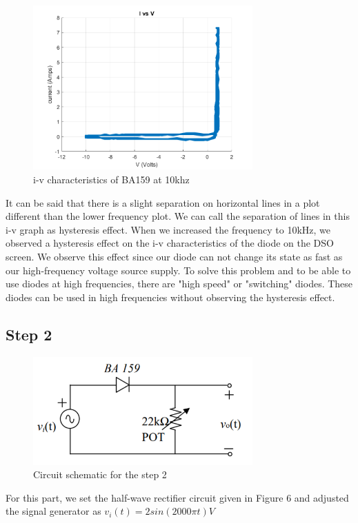 \documentclass[letterpaper,12pt]{article}
\begin{document}
\begin{figure}[H]
    \centering
    \includegraphics[width = 0.75\textwidth]{1_ba159_10khz.png}
    \caption{i-v characteristics of BA159 at 10khz}
\end{figure} 
It can be said that there is a slight separation on horizontal lines in a plot different than the lower frequency plot. We can call the separation of lines in this i-v graph as hysteresis effect. When we increased the frequency to 10kHz, we observed a hysteresis effect on the i-v characteristics of the diode on the DSO screen. We observe this effect since our diode can not change its state as fast as our high-frequency voltage source supply. To solve this problem and to be able to use diodes at high frequencies, there are "high speed" or "switching" diodes. These diodes can be used in high frequencies without observing the hysteresis effect.

\subsection{Step 2}

\begin{figure}[H]
    \centering
    \includegraphics[width = 0.75\textwidth]{2_1.png}
    \caption{Circuit schematic for the step 2}
\end{figure} 
For this part, we set the half-wave rectifier circuit given in Figure 6 and adjusted the signal generator as 
\(
v_i(t)  = 2sin(2000 \pi t) V 
\)
\end{document}
